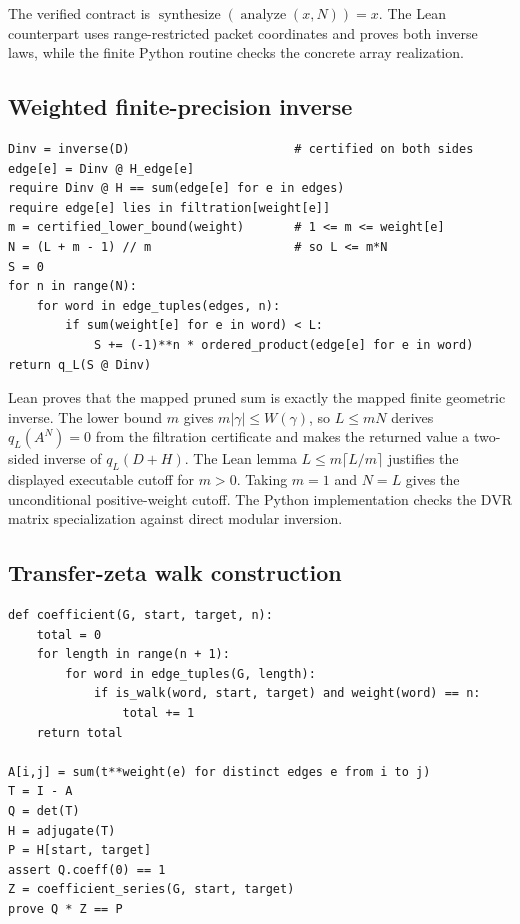 \documentclass[11pt,a4paper]{article}
\theoremstyle{definition}
\theoremstyle{remark}
\theoremstyle{definition}\newtheorem{construction}[theorem]{Construction}\newtheorem{certificate}[theorem]{Numerical Certificate}
\theoremstyle{remark}\newtheorem{boundary}[theorem]{Boundary}
\begin{document}
The verified contract is
$\operatorname{synthesize}(\operatorname{analyze}(x,N))=x$. The Lean
counterpart uses range-restricted packet coordinates and proves both inverse
laws, while the finite Python routine checks the concrete array realization.

\subsection{Weighted finite-precision inverse}\label{alg:weighted-inverse}

\begin{lstlisting}
Dinv = inverse(D)                       # certified on both sides
edge[e] = Dinv @ H_edge[e]
require Dinv @ H == sum(edge[e] for e in edges)
require edge[e] lies in filtration[weight[e]]
m = certified_lower_bound(weight)       # 1 <= m <= weight[e]
N = (L + m - 1) // m                    # so L <= m*N
S = 0
for n in range(N):
    for word in edge_tuples(edges, n):
        if sum(weight[e] for e in word) < L:
            S += (-1)**n * ordered_product(edge[e] for e in word)
return q_L(S @ Dinv)
\end{lstlisting}

Lean proves that the mapped pruned sum is exactly the mapped finite geometric
inverse. The lower bound $m$ gives $m|\gamma|\le W(\gamma)$, so
$L\le mN$ derives $q_L(A^N)=0$ from the filtration certificate and makes the
returned value a two-sided inverse of $q_L(D+H)$. The Lean lemma
$L\le m\lceil L/m\rceil$ justifies the displayed executable cutoff for
$m>0$. Taking $m=1$ and $N=L$ gives
the unconditional positive-weight cutoff. The Python implementation checks the
DVR matrix specialization against direct modular inversion.

\subsection{Transfer-zeta walk construction}\label{alg:path-zeta}

\begin{lstlisting}
def coefficient(G, start, target, n):
    total = 0
    for length in range(n + 1):
        for word in edge_tuples(G, length):
            if is_walk(word, start, target) and weight(word) == n:
                total += 1
    return total

A[i,j] = sum(t**weight(e) for distinct edges e from i to j)
T = I - A
Q = det(T)
H = adjugate(T)
P = H[start, target]
assert Q.coeff(0) == 1
Z = coefficient_series(G, start, target)
prove Q * Z == P
\end{lstlisting}
\end{document}
